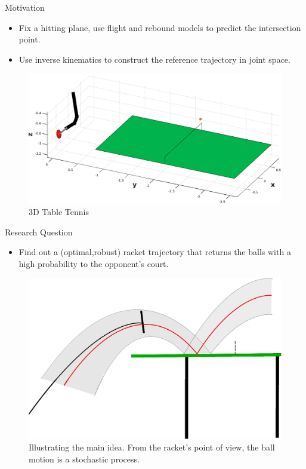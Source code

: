\documentclass[handout]{beamer}
\begin{document}
\begin{frame}{Motivation}
\begin{itemize}
\item Fix a hitting plane, use flight and rebound models to predict the intersection point. 
\item Use inverse kinematics to construct the reference trajectory in joint space.
\end{itemize}
\begin{figure}[t!]
\center
\includegraphics[scale=0.30]{tableTennis3D.eps}			
\caption{3D Table Tennis}
\label{robot2}
\end{figure}
\end{frame}
%
\begin{frame}{Research Question}
\begin{itemize}
\item Find out a (optimal,robust) racket trajectory that returns the balls with a high probability to the opponent's court.
\end{itemize}
\begin{figure}[t!]
\centering
\includegraphics[scale=0.4]{drawing.eps}			
\caption{Illustrating the main idea. From the racket's point of view, the ball motion is a stochastic process.}
\label{mainIdea}
\end{figure}
\end{frame}
%
\end{document}
